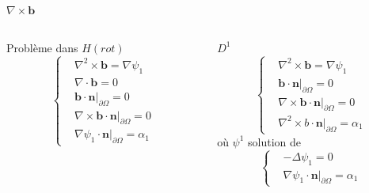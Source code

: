 \documentclass{beamer}
\newcommand{\grad}{{\nabla}}
\newcommand{\laplace}{{\Delta}}
\newcommand{\rot}{{\nabla\times}}
\newcommand{\rott}{{\nabla^2\times}}
\renewcommand{\div}{{\nabla\cdot}}
\newcommand{\restr}{{\big\rvert_{\partial\Omega}}}
\begin{document}
\begin{frame}{$\rot \mathbf{b}$}
\begin{columns}[t]
\begin{column}{5cm}
\begin{block}{Problème dans $ H(rot)$}
\[\left\{\begin{aligned}
&\rott \mathbf{b} = \grad\psi_1\\
&\div \mathbf{b} = 0\\
&\mathbf{b}\cdot \mathbf{n}\restr = 0\\
&\rot \mathbf{b}\cdot \mathbf{n}\restr = 0\\
&\grad\psi_1\cdot \mathbf{n}\restr = \alpha_1
\end{aligned}\right.\]
\end{block}
\end{column}
\begin{column}{5cm}
\begin{block}{$ D^1$}
\[\left\{\begin{aligned}
&\rott \mathbf{b} = \grad\psi_1\\
&\mathbf{b}\cdot \mathbf{n}\restr = 0\\
&\rot \mathbf{b}\cdot \mathbf{n}\restr = 0\\
&\rott b\cdot \mathbf{n}\restr = \alpha_1
\end{aligned}\right.\]
où $\psi^1$ solution de
\[\left\{\begin{aligned}
&-\laplace\psi_1 = 0\\
&\grad\psi_1\cdot \mathbf{n}\restr=\alpha_1
\end{aligned}\right.\]
\end{block}
\end{column}
\end{columns}
\end{frame}
\end{document}
